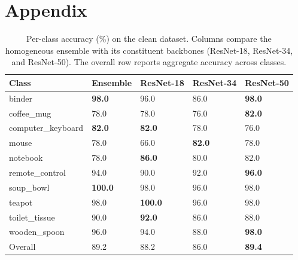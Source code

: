 \section{Appendix}

\begin{table}[!htbp]
\caption{Per-class accuracy (\%) on the clean dataset. Columns compare the homogeneous ensemble with its constituent backbones (ResNet-18, ResNet-34, and ResNet-50). The overall row reports aggregate accuracy across classes.}
\label{tab:homo_clean}

\centering
\begin{tabularx}{\linewidth}{lYYYY}
\toprule
Class & {Ensemble} & {ResNet-18} & {ResNet-34} & {ResNet-50} \\
\midrule
binder             & \textbf{98.0} & 96.0 & 86.0 & \textbf{98.0} \\
coffee\_mug        & 78.0 & 78.0 & 76.0 & \textbf{82.0} \\
computer\_keyboard & \textbf{82.0} & \textbf{82.0} & 78.0 & 76.0 \\
mouse              & 78.0 & 66.0 & \textbf{82.0} & 78.0 \\
notebook           & 78.0 & \textbf{86.0} & 80.0 & 82.0 \\
remote\_control    & 94.0 & 90.0 & 92.0 & \textbf{96.0} \\
soup\_bowl         & \textbf{100.0} & 98.0 & 96.0 & 98.0 \\
teapot             & 98.0 & \textbf{100.0} & 96.0 & 98.0 \\
toilet\_tissue     & 90.0 & \textbf{92.0} & 86.0 & 88.0 \\
wooden\_spoon      & 96.0 & 94.0 & 88.0 & \textbf{98.0} \\
\midrule
Overall            & 89.2 & 88.2 & 86.0 & \textbf{89.4} \\
\bottomrule
\end{tabularx}

\end{table}

